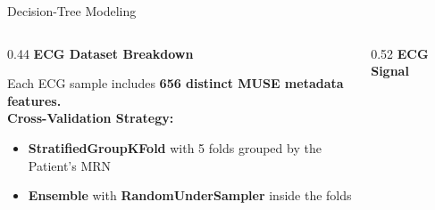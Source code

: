 \documentclass[10pt,aspectratio=169]{beamer}
\newcommand{\Raleway}{\sffamily}
\begin{document}
\begin{frame}{Decision-Tree Modeling}
  \begin{columns}[T]

    \begin{column}{0.44\textwidth}
      \centering
      {\small\Raleway\bfseries\color{aggieblue} ECG Dataset Breakdown}\\[1.0em]

      \renewcommand{\arraystretch}{1.5}
      
      \vfill %
      
      \begin{flushleft}
      \small\color{coolgray} %
      Each ECG sample includes \textbf{656 distinct MUSE metadata features.}\\[1.2em]

      \textbf{Cross-Validation Strategy:}
      \begin{itemize}
        \setlength{\itemsep}{4pt} %
        \footnotesize
        \item \textbf{StratifiedGroupKFold} with 5 folds grouped by the Patient's MRN
        \item \textbf{Ensemble} with \textbf{RandomUnderSampler} inside the folds
      \end{itemize}
      \end{flushleft}
    \end{column}

    \begin{column}{0.52\textwidth}
      \centering
      {\small\Raleway\bfseries\color{aggieblue} ECG Signal}\\[0.5em]


\end{column}
\end{columns}
\end{frame}
\end{document}
